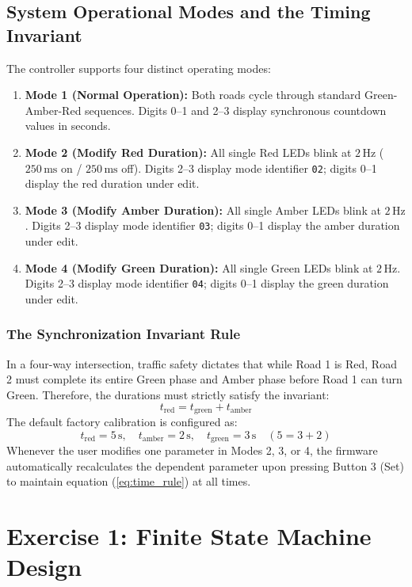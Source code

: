 \documentclass{hcmut-report}
\begin{document}
\subsection{System Operational Modes and the Timing Invariant}
The controller supports four distinct operating modes:
\begin{enumerate}
    \item \textbf{Mode 1 (Normal Operation):} Both roads cycle through standard Green-Amber-Red sequences. Digits 0--1 and 2--3 display synchronous countdown values in seconds.
    \item \textbf{Mode 2 (Modify Red Duration):} All single Red LEDs blink at $2\,\text{Hz}$ ($250\,\text{ms}$ on / $250\,\text{ms}$ off). Digits 2--3 display mode identifier \texttt{02}; digits 0--1 display the red duration under edit.
    \item \textbf{Mode 3 (Modify Amber Duration):} All single Amber LEDs blink at $2\,\text{Hz}$. Digits 2--3 display mode identifier \texttt{03}; digits 0--1 display the amber duration under edit.
    \item \textbf{Mode 4 (Modify Green Duration):} All single Green LEDs blink at $2\,\text{Hz}$. Digits 2--3 display mode identifier \texttt{04}; digits 0--1 display the green duration under edit.
\end{enumerate}

\subsubsection{The Synchronization Invariant Rule}
In a four-way intersection, traffic safety dictates that while Road 1 is Red, Road 2 must complete its entire Green phase and Amber phase before Road 1 can turn Green. Therefore, the durations must strictly satisfy the invariant:
\begin{equation}
    t_{\text{red}} = t_{\text{green}} + t_{\text{amber}}
    \label{eq:time_rule}
\end{equation}
The default factory calibration is configured as:
\begin{equation}
    t_{\text{red}} = 5\,\text{s}, \quad t_{\text{amber}} = 2\,\text{s}, \quad t_{\text{green}} = 3\,\text{s} \quad (5 = 3 + 2)
\end{equation}
Whenever the user modifies one parameter in Modes 2, 3, or 4, the firmware automatically recalculates the dependent parameter upon pressing Button 3 (Set) to maintain equation (\ref{eq:time_rule}) at all times.


\newpage
\section{Exercise 1: Finite State Machine Design}
\end{document}
